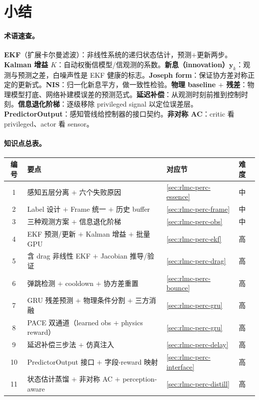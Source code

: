 \section*{小结}
\label{sec:rlmc-perc-summary}

\paragraph{术语速查。}\textbf{EKF}（扩展卡尔曼滤波）：非线性系统的递归状态估计，预测$+$更新两步。\textbf{Kalman 增益 $K$}：自动权衡信模型/信观测的系数。\textbf{新息（innovation）}$\mathbf y_k$：观测与预测之差，白噪声性是 EKF 健康的标志。\textbf{Joseph form}：保证协方差对称正定的更新式。\textbf{NIS}：归一化新息平方，做一致性检验。\textbf{物理 baseline $+$ 残差}：物理模型打底、网络补建模误差的预测范式。\textbf{延迟补偿}：从观测时刻前推到控制时刻。\textbf{信息退化阶梯}：逐级移除 privileged signal 以定位误差层。\textbf{PredictorOutput}：感知管线给控制器的接口契约。\textbf{非对称 AC}：critic 看 privileged、actor 看 sensor。

\paragraph{知识点总表。}

\begin{center}
\small
\begin{tabular}{@{}clll@{}}
\toprule
编号 & 要点 & 对应节 & 难度 \\
\midrule
1 & 感知五层分离 $+$ 六个失败原因 & \cref{sec:rlmc-perc-essence} & 中 \\
2 & Label 设计 $+$ Frame 统一 $+$ 历史 buffer & \cref{sec:rlmc-perc-frame} & 中 \\
3 & 三种观测方案 $+$ 信息退化阶梯 & \cref{sec:rlmc-perc-obs} & 中 \\
4 & EKF 预测/更新 $+$ Kalman 增益 $+$ 批量 GPU & \cref{sec:rlmc-perc-ekf} & 高 \\
5 & 含 drag 非线性 EKF $+$ Jacobian 推导/验证 & \cref{sec:rlmc-perc-drag} & 高 \\
6 & 弹跳检测 $+$ cooldown $+$ 协方差重置 & \cref{sec:rlmc-perc-bounce} & 高 \\
7 & GRU 残差预测 $+$ 物理条件分割 $+$ 三方消融 & \cref{sec:rlmc-perc-gru} & 高 \\
8 & PACE 双通道（learned obs $+$ physics reward） & \cref{sec:rlmc-perc-gru} & 高 \\
9 & 延迟补偿三步法 $+$ 仿真注入 & \cref{sec:rlmc-perc-delay} & 高 \\
10 & PredictorOutput 接口 $+$ 字段-reward 映射 & \cref{sec:rlmc-perc-interface} & 高 \\
11 & 状态估计蒸馏 $+$ 非对称 AC $+$ perception-aware & \cref{sec:rlmc-perc-distill} & 高 \\
\bottomrule
\end{tabular}
\end{center}

